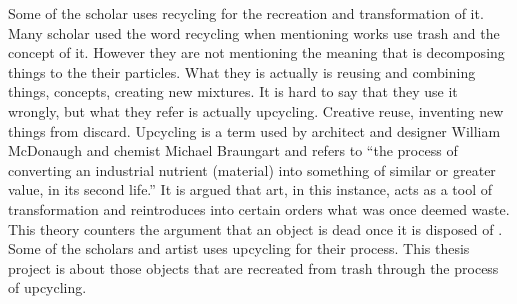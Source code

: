Some of the scholar uses recycling \citep{cerny1996recycled,herman1998trashformations} for the recreation and transformation of it.  Many scholar used the word recycling when mentioning works use trash and the concept of it. However they are not mentioning the meaning that is decomposing things to the their particles. What they is actually is reusing and combining things, concepts, creating new mixtures. It is hard to say that they use it wrongly, but what they refer is actually upcycling. Creative reuse, inventing new things from discard. Upcycling is a term used by architect and designer William McDonaugh and chemist Michael Braungart and refers to “the process of converting an industrial nutrient (material) into something of similar or greater value, in its second life.” It is argued that art, in this instance, acts as a tool of transformation and reintroduces into certain orders what was once deemed waste. This theory counters the argument that an object is dead once it is disposed of \citep{emgin2012trashion}. Some of the scholars and artist uses upcycling for their process. This thesis project is about those objects that are recreated from trash through the process of upcycling.











